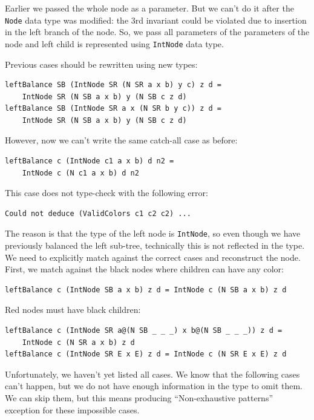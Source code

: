 \documentclass{tmr}
\begin{document}
Earlier we passed the whole node as a parameter. But we can't do it after the \verb|Node| data type was modified: the 3rd invariant could be violated due to insertion in the left branch of the node. So, we pass all parameters of the parameters of the node and left child is represented using \verb|IntNode| data type.

Previous cases should be rewritten using new types:

\begin{Verbatim}
leftBalance SB (IntNode SR (N SR a x b) y c) z d =
    IntNode SR (N SB a x b) y (N SB c z d)
leftBalance SB (IntNode SR a x (N SR b y c)) z d =
    IntNode SR (N SB a x b) y (N SB c z d)
\end{Verbatim}

However, now we can't write the same catch-all case as before:

\begin{Verbatim}
leftBalance c (IntNode c1 a x b) d n2 =
    IntNode c (N c1 a x b) d n2
\end{Verbatim}

This case does not type-check with the following error:

\begin{Verbatim}
Could not deduce (ValidColors c1 c2 c2) ...
\end{Verbatim}

The reason is that the type of the left node is \verb|IntNode|, so even though we have previously balanced the left sub-tree, technically this is not reflected in the type. We need to explicitly match against the correct cases and reconstruct the node. First, we match against the black nodes where children can have any color:

\begin{Verbatim}
leftBalance c (IntNode SB a x b) z d = IntNode c (N SB a x b) z d
\end{Verbatim}

Red nodes must have black children:

\begin{Verbatim}
leftBalance c (IntNode SR a@(N SB _ _ _) x b@(N SB _ _ _)) z d =
    IntNode c (N SR a x b) z d
leftBalance c (IntNode SR E x E) z d = IntNode c (N SR E x E) z d
\end{Verbatim}

Unfortunately, we haven't yet listed all cases. We know that the following cases can't happen, but we do not have enough information in the type to omit them. We can skip them, but this means producing ``Non-exhaustive patterns'' exception for these impossible cases.
\end{document}
